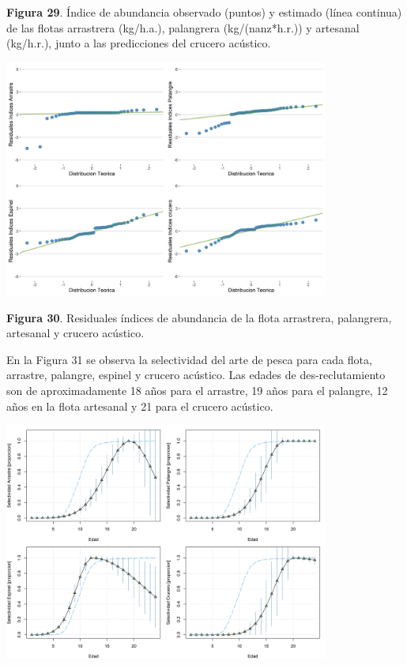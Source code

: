 \documentclass[
  spanish,
]{article}
\begin{document}
\small \textbf{Figura 29}. Índice de abundancia observado (puntos) y
estimado (línea continua) de las flotas arrastrera (kg/h.a.), palangrera
(kg/(nanz*h.r.)) y artesanal (kg/h.r.), junto a las predicciones del
crucero acústico. \vspace{0.5cm} \normalsize

\begin{center}
\includegraphics[width=0.8\textwidth]{Figuras/resid.ind.png}
\end{center}

\small \textbf{Figura 30}. Residuales índices de abundancia de la flota
arrastrera, palangrera, artesanal y crucero acústico. \vspace{0.5cm}
\normalsize

En la Figura 31 se observa la selectividad del arte de pesca para cada
flota, arrastre, palangre, espinel y crucero acústico. Las edades de
des-reclutamiento son de aproximadamente 18 años para el arrastre, 19
años para el palangre, 12 años en la flota artesanal y 21 para el
crucero acústico.

\begin{center}
\includegraphics[width=0.8\textwidth]{Figuras/selectivities.png}
\end{center}
\end{document}
